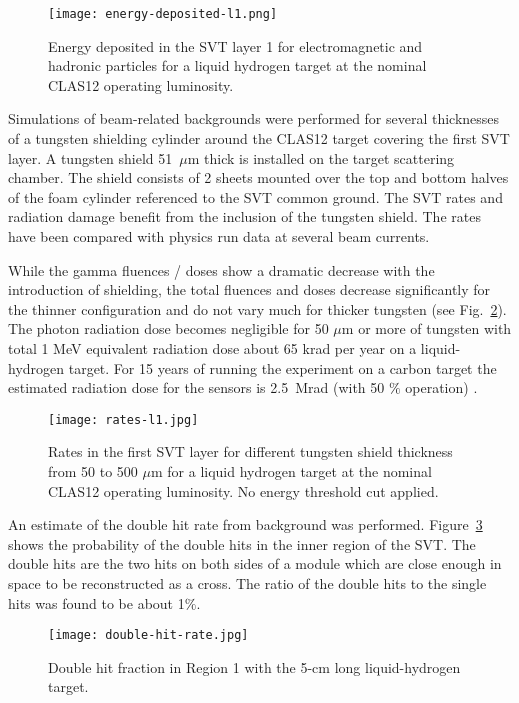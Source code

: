 \begin{figure}[hbt] 
\centering 
\texttt{[image: energy-deposited-l1.png]}
\caption{Energy deposited in the SVT layer 1 for electromagnetic and hadronic particles for a liquid hydrogen target at the nominal CLAS12 operating luminosity.}
\label{fig:energy-deposited-l1}
\end{figure}

Simulations of beam-related backgrounds were performed for several thicknesses of a tungsten shielding cylinder around the CLAS12 target covering the first SVT layer. A tungsten shield 51~$\mu$m thick is installed on the target scattering chamber. The shield consists of 2 sheets mounted over the top and bottom halves of the foam cylinder referenced to the SVT common ground. The SVT rates and radiation damage benefit from the inclusion of the tungsten shield. The rates have been compared with physics run data at several beam currents.

While the gamma fluences / doses show a dramatic decrease with the introduction of shielding, the total fluences and doses decrease significantly for the thinner configuration and do not vary much for thicker tungsten (see Fig.~\ref{fig:rates-l1}). The photon radiation dose becomes negligible for 50 $\mu$m or more of tungsten with total 1 MeV equivalent radiation dose about 65 krad per year on a liquid-hydrogen target. For 15 years of running the experiment on a carbon target the estimated radiation dose for the sensors is 2.5~Mrad (with 50 $\%$ operation) \cite{TDRSVT}. 

\begin{figure}[hbt] 
\centering 
\texttt{[image: rates-l1.jpg]}
\caption{Rates in the first SVT layer for different tungsten shield thickness from 50 to 500 $\mu$m for a liquid hydrogen target at the nominal CLAS12 operating luminosity. No energy threshold cut applied.}
\label{fig:rates-l1}
\end{figure}

An estimate of the double hit rate from background was performed. Figure~\ref{fig:double-hit-rate} shows the probability of the double hits in the inner region of the SVT. The double hits are the two hits on both sides of a module which are close enough in space to be reconstructed as a cross. The ratio of the double hits to the single hits was found to be about 1$\%$.

\begin{figure}[hbt] 
\centering 
\texttt{[image: double-hit-rate.jpg]}
\caption{Double hit fraction in Region 1 with the 5-cm long liquid-hydrogen target.}
\label{fig:double-hit-rate}
\end{figure}

